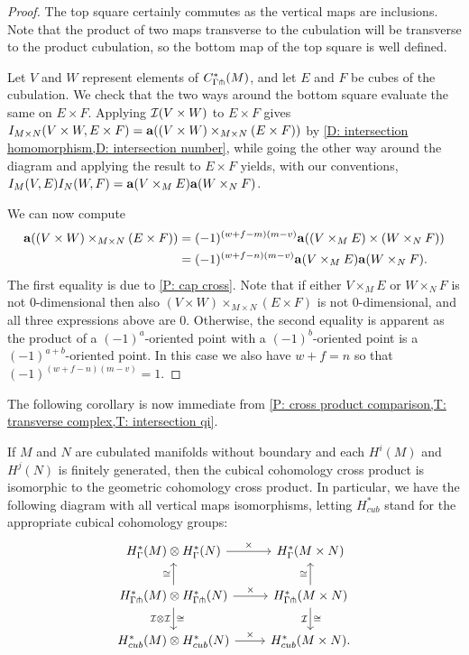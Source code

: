 \begin{proof}
	The top square certainly commutes as the vertical maps are inclusions.
	Note that the product of two maps transverse to the cubulation will be transverse to the product cubulation, so the bottom map of the top square is well defined.

	Let $V$ and $W$ represent elements of $C^*_{\Gamma\pitchfork}(M)$, and let $E$ and $F$ be cubes of the cubulation.
	We check that the two ways around the bottom square evaluate the same on $E \times F$.
	Applying $\mathcal{I}(V \times W)$ to $E \times F$ gives $I_{M \times N}(V \times W, E \times F) = \mathbf{a}((V \times W)\times_{M \times N}(E \times F))$ by \cref{D: intersection homomorphism,D: intersection number}, while going the other way around the diagram and applying the result to $E \times F$ yields, with our conventions, $I_M(V,E)I_N(W,F) = \mathbf{a}(V \times_M E)\mathbf{a}(W \times_N F)$.

	We can now compute
	\begin{align*}
		\mathbf{a}((V \times W)\times_{M \times N}(E \times F))& = (-1)^{(w+f-m)(m-v)}\mathbf{a}((V \times_M E) \times (W \times_N F))\\
		& = (-1)^{(w+f-n)(m-v)}\mathbf{a}(V \times_M E)\mathbf{a}(W \times_N F).
	\end{align*}
	The first equality is due to \cref{P: cap cross}.
	Note that if either $V \times_M E$ or $W \times_N F$ is not $0$-dimensional then also $(V \times W)\times_{M \times N}(E \times F)$ is not $0$-dimensional, and all three expressions above are $0$.
	Otherwise, the second equality is apparent as the product of a $(-1)^a$-oriented point with a $(-1)^b$-oriented point is a $(-1)^{a+b}$-oriented point.
	In this case we also have $w+f = n$ so that $(-1)^{(w+f-n)(m-v)} = 1$.
\end{proof}

The following corollary is now immediate from \cref{P: cross product comparison,T: transverse complex,T: intersection qi}.

\begin{corollary}
	If $M$ and $N$ are cubulated manifolds without boundary and each $H^i(M)$ and $H^j(N)$ is finitely generated, then the cubical cohomology cross product is isomorphic to the geometric cohomology cross product.
	In particular, we have the following diagram with all vertical maps isomorphisms, letting $H_{cub}^*$ stand for the appropriate cubical cohomology groups:
	\[
	\begin{tikzcd}
		H^*_{\Gamma}(M) \otimes H^*_{\Gamma}(N) \arrow{r}{\times} & H^*_{\Gamma}(M \times N) \\
		H^*_{\Gamma\pf}(M) \otimes H^*_{\Gamma\pf}(N) \arrow{r}{\times} \arrow[u, "\cong"] \arrow[d, "\cong", "\mc I \otimes \mc I"'] &
		H^*_{\Gamma\pf}(M \times N) \arrow[u, "\cong"] \arrow[d, "\cong", "\mc I"'] \\
		H_{cub}^*(M) \otimes H_{cub}^*(N) \arrow{r}{\times} & H_{cub}^*(M \times N).
	\end{tikzcd}
	\]
\end{corollary}

